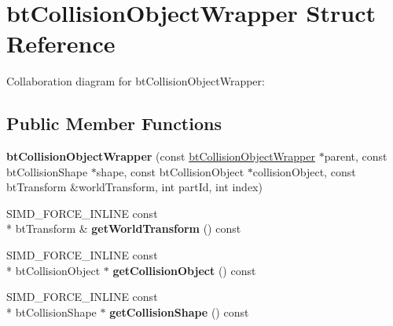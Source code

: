 \hypertarget{structbt_collision_object_wrapper}{\section{bt\+Collision\+Object\+Wrapper Struct Reference}
\label{structbt_collision_object_wrapper}
}


Collaboration diagram for bt\+Collision\+Object\+Wrapper\+:
\subsection*{Public Member Functions}
\begin{DoxyCompactItemize}
\item 
\hypertarget{structbt_collision_object_wrapper_a91f52c9f9a7499214302f1bb8a7a0766}{{\bfseries bt\+Collision\+Object\+Wrapper} (const \hyperlink{structbt_collision_object_wrapper}{bt\+Collision\+Object\+Wrapper} $\ast$parent, const bt\+Collision\+Shape $\ast$shape, const bt\+Collision\+Object $\ast$collision\+Object, const bt\+Transform \&world\+Transform, int part\+Id, int index)}\label{structbt_collision_object_wrapper_a91f52c9f9a7499214302f1bb8a7a0766}

\item 
\hypertarget{structbt_collision_object_wrapper_a54098f56a9aba2140a26bb5f9c2d16ef}{S\+I\+M\+D\+\_\+\+F\+O\+R\+C\+E\+\_\+\+I\+N\+L\+I\+N\+E const \\*
bt\+Transform \& {\bfseries get\+World\+Transform} () const }\label{structbt_collision_object_wrapper_a54098f56a9aba2140a26bb5f9c2d16ef}

\item 
\hypertarget{structbt_collision_object_wrapper_a4cdbe5ef72d007e230dbd230c580eaca}{S\+I\+M\+D\+\_\+\+F\+O\+R\+C\+E\+\_\+\+I\+N\+L\+I\+N\+E const \\*
bt\+Collision\+Object $\ast$ {\bfseries get\+Collision\+Object} () const }\label{structbt_collision_object_wrapper_a4cdbe5ef72d007e230dbd230c580eaca}

\item 
\hypertarget{structbt_collision_object_wrapper_a6a99baa197d45b7fe19a69c8cddb9592}{S\+I\+M\+D\+\_\+\+F\+O\+R\+C\+E\+\_\+\+I\+N\+L\+I\+N\+E const \\*
bt\+Collision\+Shape $\ast$ {\bfseries get\+Collision\+Shape} () const }\label{structbt_collision_object_wrapper_a6a99baa197d45b7fe19a69c8cddb9592}

\end{DoxyCompactItemize}
